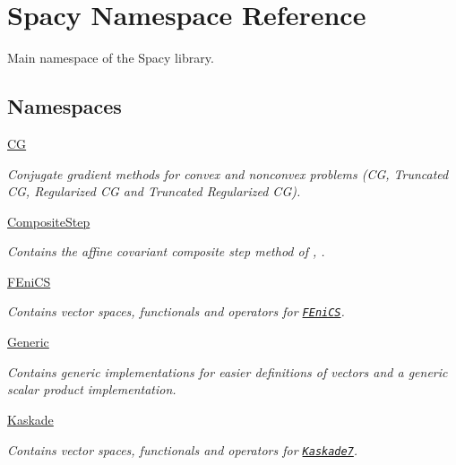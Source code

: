 \hypertarget{namespaceSpacy}{}\section{Spacy Namespace Reference}
\label{namespaceSpacy}


Main namespace of the Spacy library.  


\subsection*{Namespaces}
\begin{DoxyCompactItemize}
\item 
 \hyperlink{namespaceSpacy_1_1CG}{CG}
\begin{DoxyCompactList}\small\item\em Conjugate gradient methods for convex and nonconvex problems (CG, Truncated CG, Regularized CG and Truncated Regularized CG). \end{DoxyCompactList}\item 
 \hyperlink{namespaceSpacy_1_1CompositeStep}{Composite\+Step}
\begin{DoxyCompactList}\small\item\em Contains the affine covariant composite step method of \cite{Lubkoll2015}, \cite{Lubkoll2015a}. \end{DoxyCompactList}\item 
 \hyperlink{namespaceSpacy_1_1FEniCS}{F\+Eni\+CS}
\begin{DoxyCompactList}\small\item\em Contains vector spaces, functionals and operators for \href{www.fenicsproject.org}{\tt F\+Eni\+CS}. \end{DoxyCompactList}\item 
 \hyperlink{namespaceSpacy_1_1Generic}{Generic}
\begin{DoxyCompactList}\small\item\em Contains generic implementations for easier definitions of vectors and a generic scalar product implementation. \end{DoxyCompactList}\item 
 \hyperlink{namespaceSpacy_1_1Kaskade}{Kaskade}
\begin{DoxyCompactList}\small\item\em Contains vector spaces, functionals and operators for \href{http://www.zib.de/projects/kaskade7-finite-element-toolbox}{\tt Kaskade7}. \end{DoxyCompactList}\item 

\end{DoxyCompactItemize}
